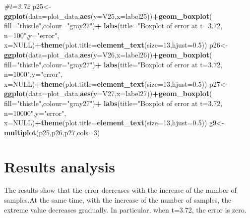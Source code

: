 \documentclass[
]{article}
\newenvironment{Shaded}{\begin{snugshade}}{\end{snugshade}}
\newcommand{\CommentTok}[1]{\textcolor[rgb]{0.56,0.35,0.01}{\textit{#1}}}
\newcommand{\DataTypeTok}[1]{\textcolor[rgb]{0.13,0.29,0.53}{#1}}
\newcommand{\DecValTok}[1]{\textcolor[rgb]{0.00,0.00,0.81}{#1}}
\newcommand{\FloatTok}[1]{\textcolor[rgb]{0.00,0.00,0.81}{#1}}
\newcommand{\KeywordTok}[1]{\textcolor[rgb]{0.13,0.29,0.53}{\textbf{#1}}}
\newcommand{\NormalTok}[1]{#1}
\newcommand{\OperatorTok}[1]{\textcolor[rgb]{0.81,0.36,0.00}{\textbf{#1}}}
\newcommand{\OtherTok}[1]{\textcolor[rgb]{0.56,0.35,0.01}{#1}}
\newcommand{\StringTok}[1]{\textcolor[rgb]{0.31,0.60,0.02}{#1}}
\begin{document}
\begin{Shaded}
\begin{Highlighting}[]
\CommentTok{#t=3.72}
\NormalTok{p25<-}\KeywordTok{ggplot}\NormalTok{(}\DataTypeTok{data=}\NormalTok{plot_data,}\KeywordTok{aes}\NormalTok{(}\DataTypeTok{y=}\NormalTok{V25,}\DataTypeTok{x=}\NormalTok{label25))}\OperatorTok{+}\KeywordTok{geom_boxplot}\NormalTok{(}
  \DataTypeTok{fill=}\StringTok{"thistle"}\NormalTok{,}\DataTypeTok{colour=}\StringTok{"gray27"}\NormalTok{)}\OperatorTok{+}
\StringTok{  }\KeywordTok{labs}\NormalTok{(}\DataTypeTok{title=}\StringTok{"Boxplot of error at t=3.72, n=100"}\NormalTok{,}\DataTypeTok{y=}\StringTok{"error"}\NormalTok{,}
       \DataTypeTok{x=}\OtherTok{NULL}\NormalTok{)}\OperatorTok{+}\KeywordTok{theme}\NormalTok{(}\DataTypeTok{plot.title=}\KeywordTok{element_text}\NormalTok{(}\DataTypeTok{size=}\DecValTok{13}\NormalTok{,}\DataTypeTok{hjust=}\FloatTok{0.5}\NormalTok{))}
\NormalTok{p26<-}\KeywordTok{ggplot}\NormalTok{(}\DataTypeTok{data=}\NormalTok{plot_data,}\KeywordTok{aes}\NormalTok{(}\DataTypeTok{y=}\NormalTok{V26,}\DataTypeTok{x=}\NormalTok{label26))}\OperatorTok{+}\KeywordTok{geom_boxplot}\NormalTok{(}
  \DataTypeTok{fill=}\StringTok{"thistle"}\NormalTok{,}\DataTypeTok{colour=}\StringTok{"gray27"}\NormalTok{)}\OperatorTok{+}
\StringTok{  }\KeywordTok{labs}\NormalTok{(}\DataTypeTok{title=}\StringTok{"Boxplot of error at t=3.72, n=1000"}\NormalTok{,}\DataTypeTok{y=}\StringTok{"error"}\NormalTok{,}
       \DataTypeTok{x=}\OtherTok{NULL}\NormalTok{)}\OperatorTok{+}\KeywordTok{theme}\NormalTok{(}\DataTypeTok{plot.title=}\KeywordTok{element_text}\NormalTok{(}\DataTypeTok{size=}\DecValTok{13}\NormalTok{,}\DataTypeTok{hjust=}\FloatTok{0.5}\NormalTok{))}
\NormalTok{p27<-}\KeywordTok{ggplot}\NormalTok{(}\DataTypeTok{data=}\NormalTok{plot_data,}\KeywordTok{aes}\NormalTok{(}\DataTypeTok{y=}\NormalTok{V27,}\DataTypeTok{x=}\NormalTok{label27))}\OperatorTok{+}\KeywordTok{geom_boxplot}\NormalTok{(}
  \DataTypeTok{fill=}\StringTok{"thistle"}\NormalTok{,}\DataTypeTok{colour=}\StringTok{"gray27"}\NormalTok{)}\OperatorTok{+}
\StringTok{  }\KeywordTok{labs}\NormalTok{(}\DataTypeTok{title=}\StringTok{"Boxplot of error at t=3.72, n=10000"}\NormalTok{,}\DataTypeTok{y=}\StringTok{"error"}\NormalTok{,}
       \DataTypeTok{x=}\OtherTok{NULL}\NormalTok{)}\OperatorTok{+}\KeywordTok{theme}\NormalTok{(}\DataTypeTok{plot.title=}\KeywordTok{element_text}\NormalTok{(}\DataTypeTok{size=}\DecValTok{13}\NormalTok{,}\DataTypeTok{hjust=}\FloatTok{0.5}\NormalTok{))}
\NormalTok{g9<-}\KeywordTok{multiplot}\NormalTok{(p25,p26,p27,}\DataTypeTok{cols=}\DecValTok{3}\NormalTok{)}
\end{Highlighting}
\end{Shaded}

\hypertarget{results-analysis}{%
\section{Results analysis}\label{results-analysis}}

The results show that the error decreases with the increase of the
number of samples.At the same time, with the increase of the number of
samples, the extreme value decreases gradually. In particular, when
t=3.72, the error is zero.
\end{document}
